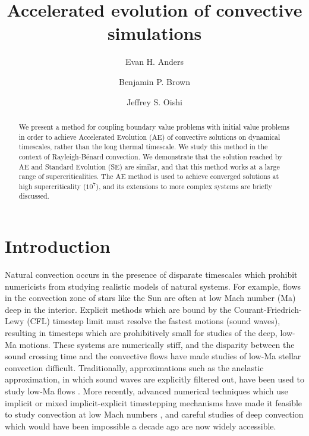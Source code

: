 \documentclass[aps, pre, onecolumn, nofootinbib, notitlepage, groupedaddress, amsfonts, amssymb, amsmath, longbibliography]{revtex4-1}
\newcommand{\RB}{Rayleigh-B\'{e}nard }
\begin{document}
\author{Evan H. Anders}
\author{Benjamin P. Brown}
\author{Jeffrey S. Oishi}
\title{Accelerated evolution of convective simulations}

\begin{abstract}
We present a method for coupling boundary value problems with initial value problems 
in order to achieve Accelerated Evolution (AE) of convective solutions on
dynamical timescales, rather than the long thermal timescale. 
We study this method in the context of \RB convection. 
We demonstrate that the solution reached by AE and Standard Evolution (SE) are
similar, and that this method works at a
large range of supercriticalities.  The AE method is used to achieve converged 
solutions at high supercriticality ($10^7$), and its extensions to more complex 
systems are briefly discussed.
\end{abstract}
\maketitle


\section{Introduction}
\label{sec:intro}
Natural convection occurs in the presence of disparate timescales which
prohibit numericists from studying realistic models of natural systems.  For example,
flows in the convection zone of stars like the Sun are often at low Mach number
(Ma) deep in the interior.
Explicit methods which are bound by the Courant-Friedrich-Lewy
(CFL) timestep limit must resolve the fastest motions (sound
waves), resulting in timesteps which are prohibitively
small for studies of the deep, low-Ma motions. These systems are numerically
stiff, and the disparity between
the sound crossing time and the convective flows have made studies of low-Ma stellar
convection difficult. Traditionally, approximations such as
the anelastic approximation, in which sound waves are explicitly filtered out,
have been used to study low-Ma flows \cite{brown&all2010, featherstone&hindman2016}.
More recently, advanced numerical techniques which use implicit or mixed
implicit-explicit timestepping mechanisms have made it feasible to study
convection at low Mach numbers \cite{viallet&all2011, viallet&all2013, viallet&all2016, lecoanet&all2014,
anders&brown2017, bordwell&all2018}, and careful studies of deep convection which
would have been impossible a decade ago are now widely accessible.
\end{document}
